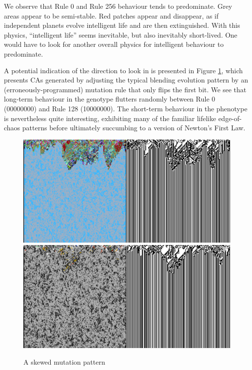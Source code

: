 \documentclass{AISB2008}
\begin{document}
We observe that Rule 0 and Rule 256 behaviour tends to predominate.
Grey areas appear to be semi-stable.  Red patches appear and
disappear, as if independent planets evolve intelligent life and are
then extinguished.  With this physics, ``intelligent life'' seems
inevitable, but also inevitably short-lived.  One would have to look
for another overall physics for intelligent behaviour to predominate.

A potential indication of the direction to look in is presented in
Figure \ref{reef}, which presents CAs generated by adjusting the
typical blending evolution pattern by an (erroneously-programmed)
mutation rule that only flips the first bit.  We see that long-term
behaviour in the genotype flutters randomly between Rule 0 (00000000)
and Rule 128 (10000000).  The short-term behaviour in the phenotype is
nevertheless quite interesting, exhibiting many of the familiar
lifelike edge-of-chaos patterns before ultimately succumbing to a
version of Newton's First Law.

\begin{figure}
\includegraphics[width=\columnwidth]{reef.png} \newline
\includegraphics[width=\columnwidth]{eoc.png} 
\caption{A skewed mutation pattern \label{reef}}
\end{figure}
\end{document}
